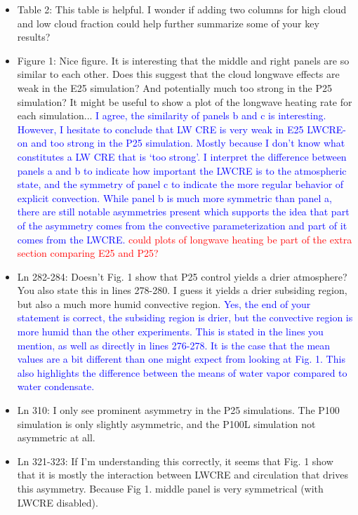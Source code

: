 \documentclass[draft]{agujournal2019}
\begin{document}
\begin{itemize}
  \item Table 2:  This table is helpful. I wonder if adding two columns for high cloud and low cloud fraction could help further summarize some of your key results?
  
  \item Figure 1: Nice figure. It is interesting that the middle and right panels are so similar to each other. Does this suggest that the cloud longwave effects are weak in the E25 simulation? And potentially much too strong in the P25 simulation? It might be useful to show a plot of the longwave heating rate for each simulation...  
  \textcolor{blue}{I agree, the similarity of panels b and c is interesting.  However, I hesitate to conclude that LW CRE is very weak in E25 LWCRE-on and 
  too strong in the P25 simulation.  Mostly because I don't know what constitutes a LW CRE that is `too strong'.  I interpret the difference between panels
  a and b to indicate how important the LWCRE is to the atmospheric state, and the symmetry of panel c to indicate the more regular behavior of explicit convection.
  While panel b is much more symmetric than panel a, there are still notable asymmetries present which supports the idea that part of the asymmetry comes from the convective parameterization and part of it comes from the LWCRE. }
  \textcolor{red}{could plots of longwave heating be part of the extra section comparing E25 and P25?}
  
  \item Ln 282-284:  Doesn't Fig. 1 show that P25 control yields a drier atmosphere? You also state this in lines 278-280. I guess it yields a drier subsiding region, but also a much more humid convective region. 
  \textcolor{blue}{Yes, the end of your statement is correct, the subsiding region is drier, but the convective region is more humid than the other experiments.  This is stated in the lines you mention, as well as directly in lines 276-278.  It is the case that the mean values are a bit different than one might expect from looking at Fig. 1.  This also highlights the difference between the means of water vapor compared to water condensate.}
  
  \item Ln 310: I only see prominent asymmetry in the P25 simulations. The P100 simulation is only slightly asymmetric, and the P100L simulation not asymmetric at all.
  
  \item Ln 321-323:   If I'm understanding this correctly, it seems that Fig. 1 show that it is mostly the interaction between LWCRE and 
  circulation that drives this asymmetry. Because Fig 1. middle panel is very symmetrical (with LWCRE disabled).


\end{itemize}
\end{document}
